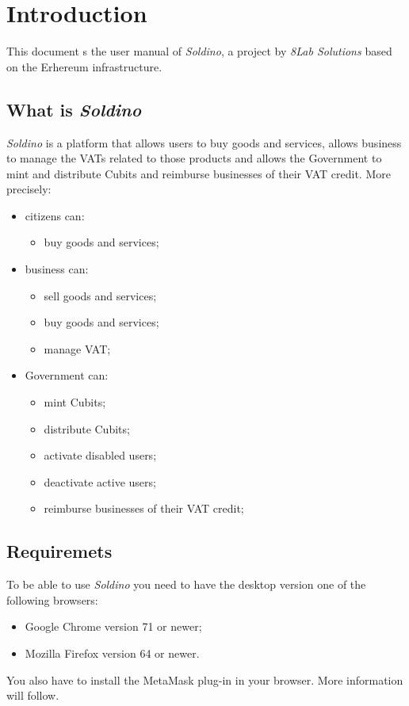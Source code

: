 \section{Introduction} 
	This document s the user manual of \textit{Soldino}, a project by 
	\textit{8Lab Solutions} based on the Erhereum infrastructure. 
	\subsection{What is \textit{Soldino}}
	\textit{Soldino} is a platform that allows 
	users to buy goods and services, allows business to manage the VATs 
	related to those products and allows the Government to mint and distribute
	Cubits and reimburse businesses of their VAT credit.
	More precisely:
	\begin{itemize}
		\item citizens can:
		\begin{itemize}
			\item  buy goods and services;
		\end{itemize}
		\item business can:
		\begin{itemize}
			\item sell goods and services;
			\item buy goods and services;
			\item manage VAT;
		\end{itemize}
		\item Government can:
		\begin{itemize}
			\item mint Cubits;
			\item distribute Cubits;
			\item activate disabled users;
			\item deactivate active users;
			\item reimburse businesses of their VAT credit;
		\end{itemize}
	\end{itemize}

\subsection{Requiremets}
	To be able to use \textit{Soldino} you need to have the desktop version 
	one of the following browsers:
	\begin{itemize}
		\item Google Chrome version 71 or newer;
		\item Mozilla Firefox version 64 or newer.
	\end{itemize}
	You also have to install the MetaMask plug-in in your browser. More 
	information will follow. 